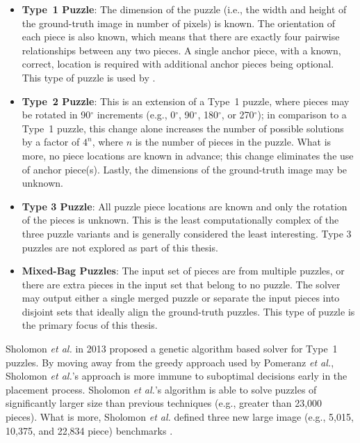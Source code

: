 \documentclass{report}
\newcommand{\numbwithdegreesymbol}[1]{#1$^\circ$}
\begin{document}
\begin{itemize}

	\item \textbf{Type~1 Puzzle}: The dimension of the puzzle (i.e., the width and height of the ground-truth image in number of pixels) is known.  The orientation of each piece is also known, which means that there are exactly four pairwise relationships between any two pieces.  A single anchor piece, with a known, correct, location is required with additional anchor pieces being optional.  This type of puzzle is used by \cite{cho2010, pomeranz2011}.
	
	\item \textbf{Type~2 Puzzle}: This is an extension of a Type~1 puzzle, where pieces may be rotated in \numbwithdegreesymbol{90} increments (e.g., \numbwithdegreesymbol{0}, \numbwithdegreesymbol{90}, \numbwithdegreesymbol{180}, or \numbwithdegreesymbol{270}); in comparison to a Type~1 puzzle, this change alone increases the number of possible solutions by a factor of $4^n$, where $n$ is the number of pieces in the puzzle.  What is more, no piece locations are known in advance; this change eliminates the use of anchor piece(s).  Lastly, the dimensions of the ground-truth image may be unknown.
	
	\item \textbf{Type 3 Puzzle}: All puzzle piece locations are known and only the rotation of the pieces is unknown.  This is the least computationally complex of the three puzzle variants and is generally considered the least interesting.  Type 3 puzzles are not explored as part of this thesis.
	
	\item \textbf{Mixed-Bag Puzzles}: The input set of pieces are from multiple puzzles, or there are extra pieces in the input set that belong to no puzzle.  The solver may output either a single merged puzzle or separate the input pieces into disjoint sets that ideally align the ground-truth puzzles.  This type of puzzle is the primary focus of this thesis.

\end{itemize}

Sholomon \textit{et al.} \cite{sholomon2013} in 2013 proposed a genetic algorithm based solver for Type~1 puzzles.  By moving away from the greedy approach used by Pomeranz \textit{et al.}, Sholomon \textit{et al.}'s approach is more immune to suboptimal decisions early in the placement process. Sholomon \textit{et al.}'s algorithm is able to solve puzzles of significantly larger size than previous techniques (e.g., greater than 23,000 pieces).  What is more, Sholomon \textit{et al.} defined three new large image (e.g., 5,015, 10,375, and 22,834 piece) benchmarks \cite{sholomonBenchmarkImages}.
\end{document}
